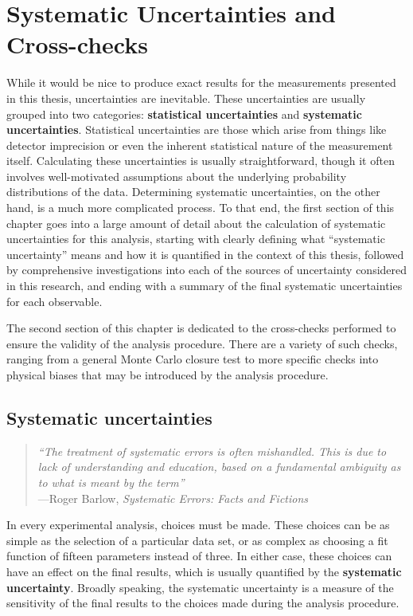 \chapter{Systematic Uncertainties and Cross-checks}
\label{ch:systematics}
While it would be nice to produce exact results for the measurements presented in this thesis, uncertainties are inevitable. These uncertainties are usually grouped into two categories: \textbf{statistical uncertainties} and \textbf{systematic uncertainties}. Statistical uncertainties are those which arise from things like detector imprecision or even the inherent statistical nature of the measurement itself. Calculating these uncertainties is usually straightforward, though it often involves well-motivated assumptions about the underlying probability distributions of the data. Determining systematic uncertainties, on the other hand, is a much more complicated process. To that end, the first section of this chapter goes into a large amount of detail about the calculation of systematic uncertainties for this analysis, starting with clearly defining what ``systematic uncertainty'' means and how it is quantified in the context of this thesis, followed by comprehensive investigations into each of the sources of uncertainty considered in this research, and ending with a summary of the final systematic uncertainties for each observable.

The second section of this chapter is dedicated to the cross-checks performed to ensure the validity of the analysis procedure. There are a variety of such checks, ranging from a general Monte Carlo closure test to more specific checks into physical biases that may be introduced by the analysis procedure.


\clearpage

\section{Systematic uncertainties}
\label{sec:systematics}
\begin{quote}
    \textit{``The treatment of systematic errors is often mishandled. This is due to lack of understanding and education, based on a fundamental ambiguity as to what is meant by the term''}\\
    \hspace*{1cm}---Roger Barlow, \textit{Systematic Errors: Facts and Fictions}~\cite{BarlowCheck}
\end{quote}

In every experimental analysis, choices must be made. These choices can be as simple as the selection of a particular data set, or as complex as choosing a fit function of fifteen parameters instead of three. In either case, these choices can have an effect on the final results, which is usually quantified by the \textbf{systematic uncertainty}. Broadly speaking, the systematic uncertainty is a measure of the sensitivity of the final results to the choices made during the analysis procedure. 

